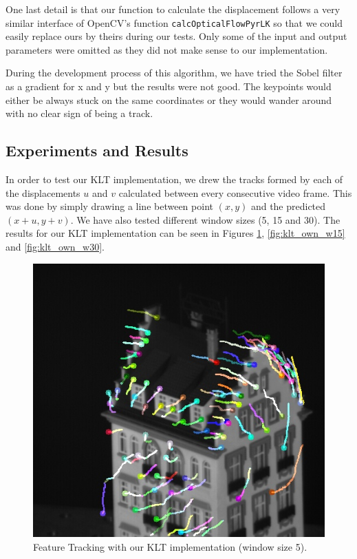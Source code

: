 \documentclass[]{IEEEtran}
\begin{document}
One last detail is that our function to calculate the displacement follows a very similar interface of OpenCV's function \texttt{calcOpticalFlowPyrLK} so that we could easily replace ours by theirs during our tests. Only some of the input and output parameters were omitted as they did not make sense to our implementation.

During the development process of this algorithm, we have tried the Sobel filter as a gradient for x and y but the results were not good. The keypoints would either be always stuck on the same coordinates or they would wander around with no clear sign of being a track.

\subsection{Experiments and Results}
In order to test our KLT implementation, we drew the tracks formed by each of the displacements $u$ and $v$ calculated between every consecutive video frame. This was done by simply drawing a line between point $(x,y)$ and the predicted $(x+u, y+v)$. We have also tested different window sizes (5, 15 and 30). The results for our KLT implementation can be seen in Figures \ref{fig:klt_own_w5}, \ref{fig:klt_own_w15} and \ref{fig:klt_own_w30}.
\begin{figure}[h]
  \includegraphics[width=\linewidth]{./figures/klt/klt-own-w5-hotel.jpg}
  \caption{Feature Tracking with our KLT implementation (window size 5).}
  \label{fig:klt_own_w5}
\end{figure}
\end{document}
